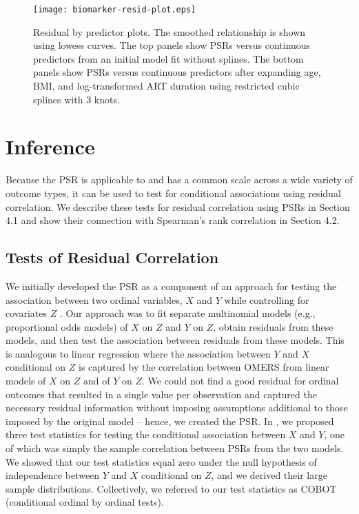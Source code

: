 \documentclass[12pt, usenatbib]{article}
\begin{document}
\begin{figure}
\begin{center}
\texttt{[image: biomarker-resid-plot.eps]}
\end{center}
\caption{Residual by predictor plots. The smoothed relationship is shown using lowess curves.  The top panels show PSRs versus continuous predictors from an initial model fit without splines.  The bottom panels show PSRs versus continuous predictors after expanding age, BMI, and log-transformed ART duration using restricted cubic splines with 3 knots.}
\label{fig3}
\end{figure}  



\section{Inference}

Because the PSR is applicable to and has a common scale across a wide variety of outcome types, it can be used to test for conditional associations using residual correlation.  We describe these tests for residual correlation using PSRs in Section 4.1 and show their connection with Spearman's rank correlation in Section 4.2.  

\subsection{Tests of Residual Correlation}

We initially developed the PSR as a component of an approach for testing the association between two ordinal variables, $X$ and $Y$ while controlling for covariates $Z$ \citep{li2010test}.  Our approach was to fit separate multinomial models (e.g., proportional odds models) of $X$ on $Z$ and $Y$ on $Z$, obtain residuals from these models, and then test the association between residuals from these models.  %
This is analogous to linear regression where the association between $Y$ and $X$ conditional on $Z$ is captured by the correlation between OMERS from linear models of $X$ on $Z$ and of $Y$ on $Z$. We could not find a good residual for ordinal outcomes that resulted in a single value per observation and captured the necessary residual information without imposing assumptions additional to those imposed by the original model -- hence, we created the PSR.  In \cite{li2010test}, we proposed three test statistics for testing the conditional association between $X$ and $Y$, one of which was simply the sample correlation between PSRs from the two models.  We showed that our test statistics equal zero under the null hypothesis of independence between $Y$ and $X$ conditional on $Z$, and we derived their large sample distributions.  Collectively, we referred to our test statistics as COBOT (conditional ordinal by ordinal tests).  
\end{document}
